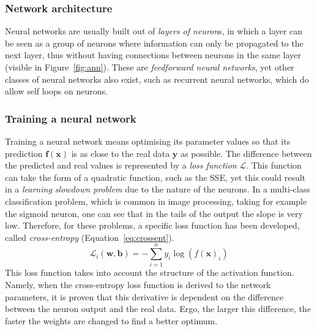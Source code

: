 \subsubsection{Network architecture \label{subsubsec:archi}}
Neural networks are usually built out of \textit{layers of neuron}s, in which a layer can be seen as a group of neurons where information can only be propagated to the next layer, thus without having connections between neurons in the same layer (visible in Figure~\ref{fig:ann}). These are \textit{feedforward neural networks}, yet other classes of neural networks also exist, such as recurrent neural networks, which do allow self loops on neurons.



\subsubsection{Training a neural network \label{subsubsec:training}}
Training a neural network means optimising its parameter values so that its prediction $\mathbf{f}(\textbf{x})$ is as close to the real data $\textbf{y}$ as possible. The difference between the predicted and real values is represented by a \textit{loss function} $\mathcal{L}$. This function can take the form of a quadratic function, such as the SSE, yet this could result in a \textit{learning slowdown problem} due to the nature of the neurons. In a multi-class classification problem, which is common in image processing, taking for example the sigmoid neuron, one can see that in the tails of the output the slope is very low. Therefore, for these problems, a specific loss function has been developed, called \textit{cross-entropy} (Equation~\ref{eq:crossent}). 
\begin{equation} \label{eq:crossent}
\mathcal{L}_i(\mathbf{w}, \mathbf{b}) = -\sum_{i=1}^{n} y_i \log(f(\mathbf{x})_i)
\end{equation}
This loss function takes into account the structure of the activation function. Namely, when the cross-entropy loss function is derived to the network parameters, it is proven that this derivative is dependent on the difference between the neuron output and the real data. Ergo, the larger this difference, the faster the weights are changed to find a better optimum.



